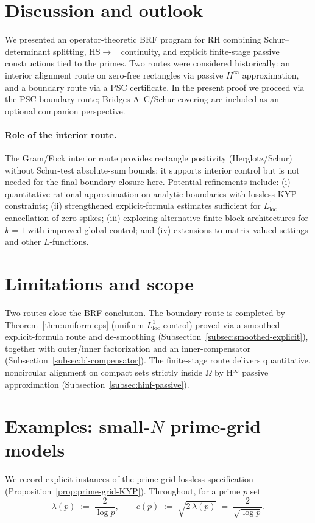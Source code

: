 \documentclass[11pt]{article}
\theoremstyle{definition}
\theoremstyle{remark}
\DeclareMathOperator{\dettwo}{det_2}
\begin{document}
\section{Discussion and outlook}\label{sec:discussion}
We presented an operator-theoretic BRF program for RH combining Schur--determinant splitting, HS\(\to\)\(\dettwo\) continuity, and explicit finite-stage passive constructions tied to the primes. Two routes were considered historically: an interior alignment route on zero-free rectangles via passive $H^\infty$ approximation, and a boundary route via a PSC certificate. In the present proof we proceed via the PSC boundary route; Bridges A--C/Schur-covering are included as an optional companion perspective.
\paragraph{Role of the interior route.}
The Gram/Fock interior route provides rectangle positivity (Herglotz/Schur) without Schur-test absolute-sum bounds; it supports interior control but is not needed for the final boundary closure here.
Potential refinements include: (i) quantitative rational approximation on analytic boundaries with lossless KYP constraints; (ii) strengthened explicit-formula estimates sufficient for $L^1_{\mathrm{loc}}$ cancellation of zero spikes; (iii) exploring alternative finite-block architectures for $k=1$ with improved global control; and (iv) extensions to matrix-valued settings and other $L$-functions.

\fi %
\section{Limitations and scope}\label{sec:limitations}
Two routes close the BRF conclusion. The boundary route is completed by Theorem~\ref{thm:uniform-eps} (uniform $L^1_{\mathrm{loc}}$ control) proved via a smoothed explicit-formula route and de-smoothing (Subsection~\ref{subsec:smoothed-explicit}), together with outer/inner factorization and an inner-compensator (Subsection~\ref{subsec:bl-compensator}). The finite-stage route delivers quantitative, noncircular alignment on compact sets strictly inside \(\Omega\) by H$^\infty$ passive approximation (Subsection~\ref{subsec:hinf-passive}).

\iffalse %
\section{Examples: small-$N$ prime-grid models}\label{sec:examples}
We record explicit instances of the prime-grid lossless specification (Proposition~\ref{prop:prime-grid-KYP}). Throughout, for a prime \(p\) set
\[
 \lambda(p)\;:=\;\frac{2}{\log p},\qquad c(p)\;:=\;\sqrt{2\,\lambda(p)}\;=\;\frac{2}{\sqrt{\log p}}.
\]
\end{document}
